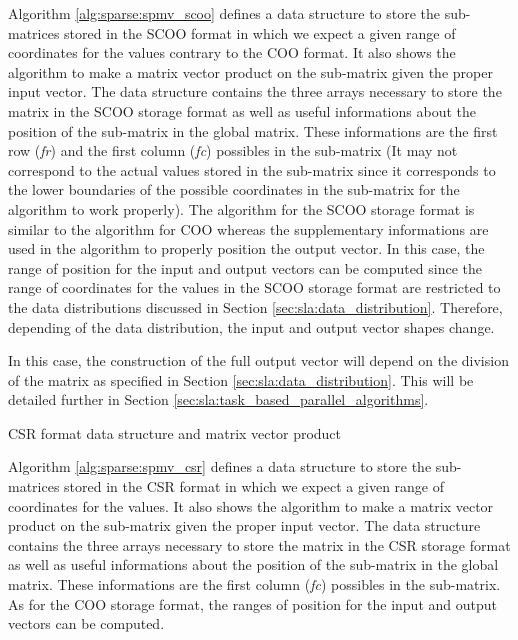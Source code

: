 Algorithm \ref{alg:sparse:spmv_scoo} defines a data structure to store the sub-matrices stored in the SCOO format in which we expect a given range of coordinates for the values contrary to the COO format.
It also shows the algorithm to make a matrix vector product on the sub-matrix given the proper input vector.
The data structure contains the three arrays necessary to store the matrix in the SCOO storage format as well as useful informations about the position of the sub-matrix in the global matrix.
These informations are the first row (\textit{fr}) and the first column (\textit{fc}) possibles in the sub-matrix (It may not correspond to the actual values stored in the sub-matrix since it corresponds to the lower boundaries of the possible coordinates in the sub-matrix for the algorithm to work properly).
The algorithm for the SCOO storage format is similar to the algorithm for COO whereas the supplementary informations are used in the algorithm to properly position the output vector.
In this case, the range of position for the input and output vectors can be computed since the range of coordinates for the values in the SCOO storage format are restricted to the data distributions discussed in Section \ref{sec:sla:data_distribution}.
Therefore, depending of the data distribution, the input and output vector shapes change.

In this case, the construction of the full output vector will depend on the division of the matrix as specified in Section \ref{sec:sla:data_distribution}.
This will be detailed further in Section \ref{sec:sla:task_based_parallel_algorithms}.


\begin{algorithm}[h]
	\DontPrintSemicolon
	\SetAlgoVlined
	\caption{CSR format data structure and matrix vector product\label{alg:sparse:spmv_csr}}

	\;
\end{algorithm}

Algorithm \ref{alg:sparse:spmv_csr} defines a data structure to store the sub-matrices stored in the CSR format in which we expect a given range of coordinates for the values.
It also shows the algorithm to make a matrix vector product on the sub-matrix given the proper input vector.
The data structure contains the three arrays necessary to store the matrix in the CSR storage format as well as useful informations about the position of the sub-matrix in the global matrix.
These informations are the first column (\textit{fc}) possibles in the sub-matrix.
As for the COO storage format, the ranges of position for the input and output vectors can be computed.


